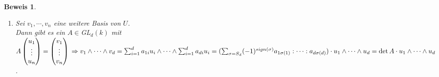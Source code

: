 \documentclass[a4paper,12pt]{report}
\theoremstyle{break}
\theoremstyle{nonumberbreak}
\theoremstyle{nonumberplain}
\newtheorem{Bew}{Beweis}
\begin{document}
\begin{Bew}
\begin{enumerate}
\item Sei $v_1,\cdots,v_n$ eine weitere Basis von $U$.\\
Dann gibt es ein $A\in$GL$_d(k)$ mit 
$A\begin{pmatrix}
u_1\\
\vdots\\
u_n
\end{pmatrix}=
\begin{pmatrix}
v_1\\
\vdots\\
v_n
\end{pmatrix}\\
\Rightarrow v_1\wedge\cdots\wedge v_d=\sum_{i=1}^da_{1i}u_i\wedge\cdots\wedge\sum_{i=1}^da_{di}u_i=\\
(\sum_{\sigma=S_d}(-1)^{sign(\sigma)}a_{1\sigma(1)}:\cdots:a_{d\sigma(d)})\cdot u_1\wedge\cdots\wedge u_d=\det A\cdot u_1\wedge\cdots\wedge u_d$.
\end{enumerate}
\end{Bew}
\end{document}

